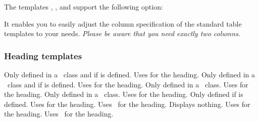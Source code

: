 \documentclass{acro-manual}
\begin{document}
The templates , , and
 support the following option:
\begin{options}
    It enables you to easily adjust the column specification
    of the standard table templates to your needs.  \emph{Please be aware that
      you need \emph{exactly} two columns}.
\end{options}

\subsubsection{Heading templates}
\begin{templates}
    Only defined in a \KOMAScript\ class and if  is defined. Uses
     for the heading.
    Only defined in a \KOMAScript\ class and if
     is defined. Uses  for the heading.
    Only defined in a \KOMAScript\ class. Uses  for the heading.
    Only defined in a \KOMAScript\ class. Uses 
    for the heading.
    Only defined if  is defined. Uses  for the heading.
    Uses \sarg\ for the heading.
    Displays nothing.
    Uses  for the heading.
    Uses \sarg\ for the heading.
\end{templates}
\end{document}
